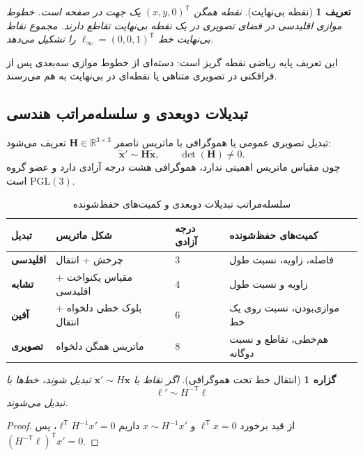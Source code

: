 \documentclass[12pt,openany,oneside]{book}
\newtheorem{definition}{تعریف}[chapter]
\newtheorem{proposition}{گزاره}[chapter]
\newcommand{\R}{\mathbb{R}}
\newcommand{\trans}{^{\mathsf T}}
\newcommand{\vect}[1]{\bm{#1}}
\newcommand{\mat}[1]{\bm{#1}}
\newcommand{\PGL}{\mathrm{PGL}}
\begin{document}
\begin{definition}[نقطه بی‌نهایت]
نقطه همگن \((x,y,0)\trans\) یک جهت در صفحه است. خطوط موازی اقلیدسی در فضای تصویری در یک نقطه بی‌نهایت تقاطع دارند.
مجموع نقاط بی‌نهایت خط \(\ell_\infty=(0,0,1)\trans\) را تشکیل می‌دهد.
\end{definition}

این تعریف پایه ریاضی نقطه گریز است: دسته‌ای از خطوط موازی سه‌بعدی پس از فرافکنی در تصویری متناهی یا نقطه‌ای در بی‌نهایت
به هم می‌رسند.

\subsection{تبدیلات دوبعدی و سلسله‌مراتب هندسی}
تبدیل تصویری عمومی یا هموگرافی با ماتریس ناصفر \(\mat H\in\R^{3\times3}\) تعریف می‌شود:
\begin{equation}
\widetilde{\vect x}'\sim\mat H\widetilde{\vect x},\qquad \det(\mat H)\neq0.
\end{equation}
چون مقیاس ماتریس اهمیتی ندارد، هموگرافی هشت درجه آزادی دارد و عضو گروه \(\PGL(3)\) است.

\begin{table}[H]
\centering
\caption{سلسله‌مراتب تبدیلات دوبعدی و کمیت‌های حفظ‌شونده}
\begin{tabularx}{\textwidth}{>{\bfseries}p{2.8cm}p{3.0cm}p{2.6cm}X}
\toprule
تبدیل & شکل ماتریس & درجه آزادی & کمیت‌های حفظ‌شونده\\
\midrule
اقلیدسی & چرخش + انتقال & 3 & فاصله، زاویه، نسبت طول\\
تشابه & مقیاس یکنواخت + اقلیدسی & 4 & زاویه و نسبت طول\\
آفین & بلوک خطی دلخواه + انتقال & 6 & موازی‌بودن، نسبت روی یک خط\\
تصویری & ماتریس همگن دلخواه & 8 & هم‌خطی، تقاطع و نسبت دوگانه\\
\bottomrule
\end{tabularx}
\end{table}

\begin{proposition}[انتقال خط تحت هموگرافی]
اگر نقاط با \(\vect x'\sim H\vect x\) تبدیل شوند، خط‌ها با
\begin{equation}
\vect\ell'\sim H^{-\mathsf T}\vect\ell
\end{equation}
تبدیل می‌شوند.
\end{proposition}
\begin{proof}
از قید برخورد \(\ell\trans x=0\) و \(x\sim H^{-1}x'\) داریم
\(\ell\trans H^{-1}x'=0\)، پس \((H^{-\mathsf T}\ell)\trans x'=0\).
\end{proof}
\end{document}
